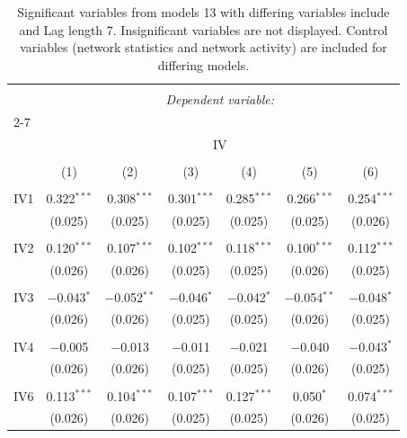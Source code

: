
\begin{table}[!htbp] \centering 
  \caption{Significant variables from models 13 with differing variables include 
                               and Lag length 7. Insignificant variables are not displayed. 
                               Control variables (network statistics and network activity) are 
                               included for differing models.} 
  \label{IVmodels1_t} 
\scriptsize 
\begin{tabular}{@{\extracolsep{5pt}}lcccccc} 
\\[-1.8ex]\hline 
\hline \\[-1.8ex] 
 & \multicolumn{6}{c}{\textit{Dependent variable:}} \\ 
\cline{2-7} 
\\[-1.8ex] & \multicolumn{6}{c}{IV} \\ 
\\[-1.8ex] & (1) & (2) & (3) & (4) & (5) & (6)\\ 
\hline \\[-1.8ex] 
 IV1 & 0.322$^{***}$ & 0.308$^{***}$ & 0.301$^{***}$ & 0.285$^{***}$ & 0.266$^{***}$ & 0.254$^{***}$ \\ 
  & (0.025) & (0.025) & (0.025) & (0.025) & (0.025) & (0.026) \\ 
  & & & & & & \\ 
 IV2 & 0.120$^{***}$ & 0.107$^{***}$ & 0.102$^{***}$ & 0.118$^{***}$ & 0.100$^{***}$ & 0.112$^{***}$ \\ 
  & (0.026) & (0.026) & (0.025) & (0.025) & (0.026) & (0.025) \\ 
  & & & & & & \\ 
 IV3 & $-$0.043$^{*}$ & $-$0.052$^{**}$ & $-$0.046$^{*}$ & $-$0.042$^{*}$ & $-$0.054$^{**}$ & $-$0.048$^{*}$ \\ 
  & (0.026) & (0.026) & (0.025) & (0.025) & (0.026) & (0.025) \\ 
  & & & & & & \\ 
 IV4 & $-$0.005 & $-$0.013 & $-$0.011 & $-$0.021 & $-$0.040 & $-$0.043$^{*}$ \\ 
  & (0.026) & (0.026) & (0.025) & (0.025) & (0.026) & (0.025) \\ 
  & & & & & & \\ 
 IV6 & 0.113$^{***}$ & 0.104$^{***}$ & 0.107$^{***}$ & 0.127$^{***}$ & 0.050$^{*}$ & 0.074$^{***}$ \\ 
  & (0.026) & (0.026) & (0.025) & (0.025) & (0.026) & (0.025) \\ 

\end{tabular}
\end{table}
